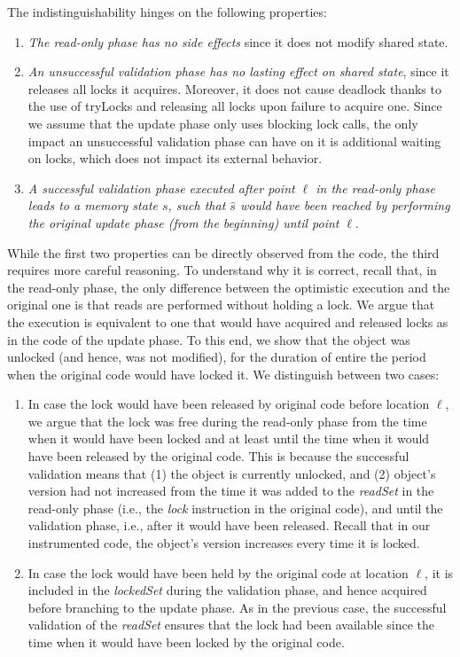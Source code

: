 \noindent
The indistinguishability hinges on the following properties:
\begin{enumerate}
\item \emph{The read-only phase has no side effects} since it does not modify shared state.
\item \emph{An unsuccessful validation phase has no lasting effect on shared state},
since it releases all locks it acquires. Moreover, it does not cause deadlock thanks to the use of tryLocks
and releasing all locks	upon failure to acquire one. Since we assume that the update phase only uses
blocking lock calls, the only impact an unsuccessful validation phase can have on it is additional waiting
on locks, which does not impact its external behavior.
\item \emph{A successful validation phase
executed after point $\ell$ in the read-only phase
leads to a memory state $s$, such that $\hat{s}$
would have been reached by performing the original
update phase (from the beginning) until point $\ell$}.
\end{enumerate}

While the first two properties can be directly observed from the code, the third requires more careful reasoning.
To understand why it is correct, recall that, in the read-only phase,
the only difference between the optimistic execution and the original one is that reads are performed without
holding a lock. We argue that the execution is equivalent to one that would have acquired and released
locks as in the code of the update phase. To this end, we show that the object was unlocked
(and hence, was not modified), for the duration of entire the period when the original code would have locked it.
We distinguish between two cases:
\begin{enumerate}
\item In case the lock would have been released by original code before location $\ell$,
we argue that the lock was free during the read-only phase from the time when it would have been locked
and at least until the time when it would have been released by the original code.
This is because the successful validation means that (1) the object is currently
unlocked, and (2) object's version had not increased from the time it was added to the \emph{readSet} in the read-only phase
(i.e., the \emph{lock} instruction in the original code), and until the
validation phase, i.e., after it would have
been released. Recall that in our instrumented code, the object's version increases every time it is locked.
\item In case the lock would have been held by the original code at location $\ell$, it is included in
the \emph{lockedSet} during the validation phase, and hence acquired before branching to the update phase.
As in the previous case, the successful validation of the \emph{readSet} ensures that the lock had been
available since the time when it would have been locked by the original code.
\end{enumerate}

